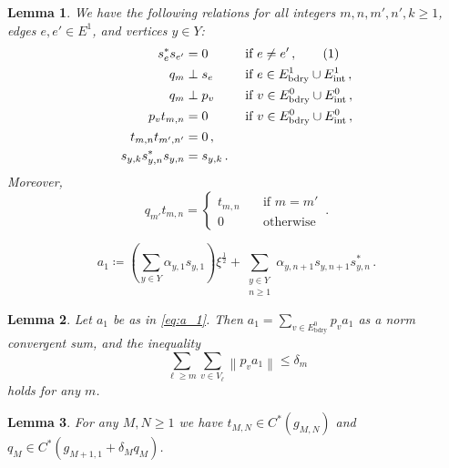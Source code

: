 \documentclass[10pt,a4paper]{amsart}
\newtheorem{lemma}{Lemma}
\newcommand{\Cstar}{\ensuremath{C^*}}
\newcommand{\Eboundary}{E^0_{\mathrm{bdry}}}
\newcommand{\Eint}{E^0_{\mathrm{int}}}
\newcommand{\edgebdy}{E^1_{\mathrm{bdry}}}
\newcommand{\edgeint}{E^1_{\mathrm{int}}}
\newcommand{\norm}[1]{\left\|#1\right\|} %
\newcommand\numberthis{\addtocounter{equation}{1}\tag{\theequation}}
\begin{document}
\begin{lemma}\label{lemma:orthogonality}
    We have the following relations for all integers $m,n,m',n',k \ge 1$, edges $e, e' \in E^1$, and vertices $y \in Y$:
    \begin{align*}
    s_e^* s_{e'} &= 0 &&\text{ if } e \neq e'\,,\numberthis\\
    q_m &\perp s_e  &&\text{ if } e \in \edgebdy \cup \edgeint\,,\\
    q_m &\perp p_v  &&\text{ if } v \in \Eboundary \cup \Eint\,,\\    
    p_v t_{m,n} &= 0 &&\text{ if } v \in \Eboundary \cup \Eint\,,\\
    t_{m,n} t_{m',n'} &= 0\,, \\
    s_{y,k} s_{y,n}^* s_{y,n} &= s_{y,k}\,.
    \end{align*}
    Moreover, 
    \begin{equation}
        q_{m'} t_{m,n} =
    \begin{cases}
        t_{m,n} \quad &\text{if } m = m'\\
        0 \quad &\text{otherwise}
    \end{cases}\,.
    \end{equation}
\end{lemma}

\begin{equation}\label{eq:a_1}
    a_1 \coloneq \left( \sum_{y \in Y} \alpha_{y,1} s_{y,1} \right)\xi^{\frac{1}{2}} + \sum_{\substack{y \in Y \\ n \ge 1}} \alpha_{y,n+1} s_{y,n+1} s_{y,n}^*\,.
\end{equation}

\begin{lemma}\label{lemma:a_1}
    Let $a_1$ be as in \eqref{eq:a_1}. Then $a_1 = \sum_{v \in \Eboundary} p_v a_1$ as a norm convergent sum, and the inequality
    \begin{equation}\label{eq:decay-of-a_1}
    \sum_{\ell \ge m} \sum_{v \in V_\ell} \norm{p_v a_1} \le \delta_m
    \end{equation}
    holds for any $m$.
\end{lemma}

\begin{lemma}%
\label{lemma:proposition-4-part1}
    For any $M,N \ge 1$ we have $t_{M,N} \in \Cstar(g_{M,N})$ and $q_{M} \in \Cstar(g_{M+1,1} + \delta_M q_M)$.
\end{lemma}
\end{document}

